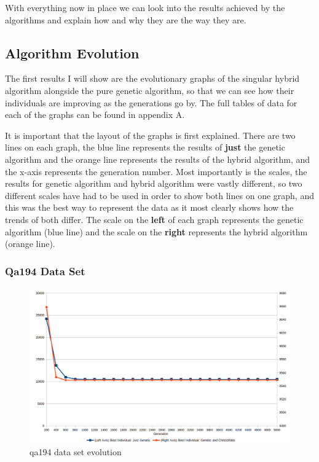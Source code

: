 \documentclass[11pt,a4paper,titlepage]{article}
\begin{document}
With everything now in place we can look into the results achieved by the algorithms and explain how and why they are the way they are.

\subsection{Algorithm Evolution}

The first results I will show are the evolutionary graphs of the singular hybrid algorithm alongside the pure genetic algorithm, so that we can see how their individuals are improving as the generations go by. The full tables of data for each of the graphs can be found in appendix A.

It is important that the layout of the graphs is first explained. There are two lines on each graph, the blue line represents the results of \textbf{just} the genetic algorithm and the orange line represents the results of the hybrid algorithm, and the x-axis represents the generation number. Most importantly is the scales, the results for genetic algorithm and hybrid algorithm were vastly different, so two different scales have had to be used in order to show both lines on one graph, and this was the best way to represent the data as it most clearly shows how the trends of both differ. The scale on the \textbf{left} of each graph represents the genetic algorithm (blue line) and the scale on the \textbf{right} represents the hybrid algorithm (orange line).

\subsubsection{Qa194 Data Set}

\begin{figure}[ht]
	\includegraphics[width=\textwidth]{qa194Evolution}
	\centering
	\caption{qa194 data set evolution}
\end{figure}
\end{document}
